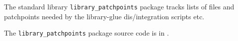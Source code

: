 
The standard library {\tt library\_patchpoints} package tracks lists of files and patchpoints needed by the library-glue dis/integration scripts etc.

The {\tt library\_patchpoints} package source code is in .



